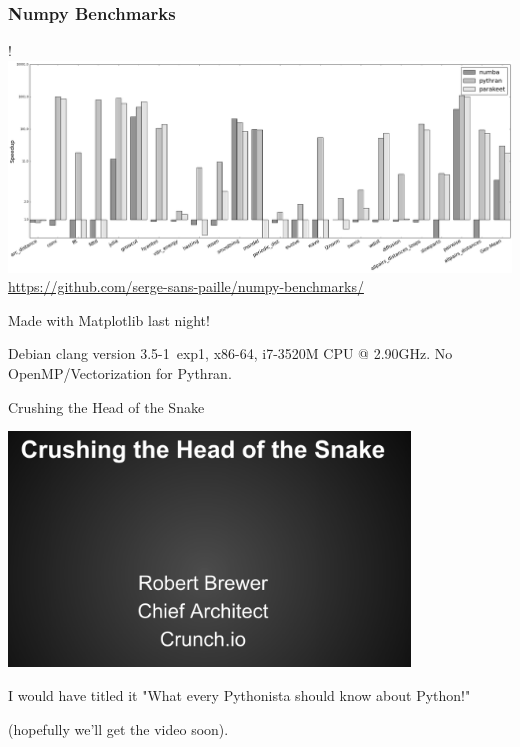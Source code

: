 \documentclass[aspectratio=1610]{beamer}
\begin{document}
\begin{frame}[fragile]
    \frametitle{Numpy Benchmarks}
   
   \resizebox {\textwidth} {!} {
    \includegraphics{timing}
   }
    \url{https://github.com/serge-sans-paille/numpy-benchmarks/}

\vfill
    \scriptsize{Made with Matplotlib last night!}
\vfill
   
    \tiny{Debian clang version 3.5-1~exp1, x86-64, i7-3520M CPU @ 2.90GHz. No OpenMP/Vectorization for Pythran.}
\end{frame}


\begin{frame}{Crushing the Head of the Snake}

  \begin{center}
    \includegraphics[width=0.8\textwidth]{crushing}

\vfill
  I would have titled it "What every Pythonista should know about Python!"
\vfill
  
  \tiny (hopefully we'll get the video soon).
\vfill
  \end{center}

\end{frame}
\end{document}
